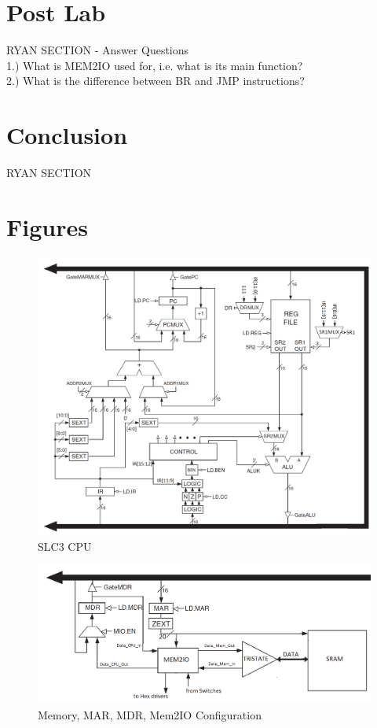 \documentclass[journal, twocolumn, final,11pt,letterpaper]{IEEEtran}
\begin{document}
\section{Post Lab}
RYAN SECTION - Answer Questions \\

1.) What is MEM2IO used for, i.e. what is its main function? \\

2.) What is the difference between BR and JMP instructions?\\

\section{Conclusion}
RYAN SECTION

\clearpage
\onecolumn
\section{Figures}

\begin{figure} [htbp]
	\centering
	\includegraphics[scale=0.27]{SLC3_Circuit.png}
	\caption{SLC3 CPU \label{fig:SLC3-Circuit}}
\end{figure}

\begin{figure} [htbp]
	\centering
	\includegraphics[scale=0.4]{Memory_Circuit.png}
	\caption{Memory, MAR, MDR, Mem2IO Configuration\label{fig:Memory-Circuit}}
\end{figure}


\end{document}
